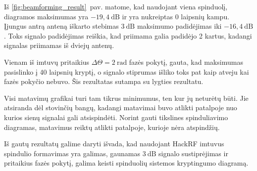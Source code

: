 \documentclass[main.tex]{subfiles}
\begin{document}
Iš \ref{fig:beamforming_result}~pav. matome, kad naudojant viena spinduolį, diagramos maksimumas
yra $-19,4\ \mathrm{dB}$ ir yra nukreiptas 0 laipsnių kampu. Įjungus antrą anteną iškarto stebimas
$3\ \mathrm{dB}$ maksimumo padidėjimas iki $-16,4\ \mathrm{dB}$. Toks signalo padidėjimas reiškia,
kad priimama galia padidėjo 2 kartus, kadangi signalas priimamas iš dviejų antenų.

Vienam iš imtuvų pritaikius $\Delta \Theta = 2\ \mathrm{rad}$ fazės pokytį, gauta, kad
maksimumas pasislinko į 40 laipsnių kryptį, o signalo stiprumas išliko toks pat kaip atveju
kai fazės pokyčio
nebuvo. Šis rezultatas sutampa su  lygties rezultatu.

Visi matavimų grafikai turi tam tikrus minimumus, ten kur jų neturėtų būti. Jie atsiranda
dėl stovinčių bangų, kadangi matavimai buvo atlikti patalpoje nuo kurios sienų signalai
gali atsispindėti. Norint gauti tikslines spinduliavimo diagramas, matavimus reiktų
atlikti patalpoje, kurioje nėra atspindžių.

Iš gautų rezultatų galime daryti išvada, kad naudojant HackRF imtuvus spindulio formavimas
yra galimas, gaunamas $3\ \mathrm{dB}$ signalo sustiprėjimas ir pritaikius fazės pokytį,
galima keisti spinduolių sistemos kryptingumo diagramą.
\end{document}
